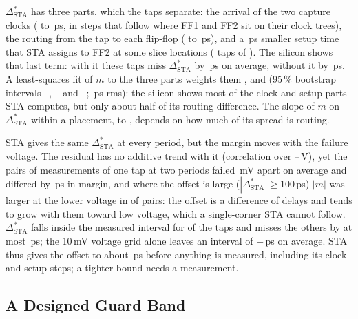 \documentclass[conference]{IEEEtran}
\newcommand{\Dst}{\Delta^{*}_\mathrm{STA}}
\begin{document}
$\Dst$ has three parts, which the \vAllN{} taps separate: the arrival of the two capture clocks
(\vDecClkLo{} to \vDecClkHi\,ps, in steps that follow where FF1 and FF2 sit on their clock trees), the routing
from the tap to each flip-flop (\vDecRouteLo{} to \vDecRouteHi\,ps), and a \vDecSuPs\,ps smaller
setup time that STA assigns to FF2 at some slice locations (\vDecSuN{} taps of \vDecSuPl). The
silicon shows that last term: with it these taps miss $\Dst$ by \vDecSuRes\,ps on average, without
it by \vDecSuNoRes\,ps. A least-squares fit of $m$ to the three parts weights them \vDecCoClk,
\vDecCoSu{} and \vDecCoRoute{} (95\,\% bootstrap intervals \vDecCoClkLo--\vDecCoClkHi,
\vDecCoSuLo--\vDecCoSuHi{} and \vDecCoRouteLo--\vDecCoRouteHi; \vDecRms\,ps rms): the silicon
shows most of the clock and setup parts STA computes, but only about half of its routing
difference. The slope of $m$ on $\Dst$ within a placement, \vPlSlopeLo{} to \vPlSlopeHi,
depends on how much of its spread is routing.

STA gives the same $\Dst$ at every period, but the margin moves with the failure voltage. The
residual has no additive trend with it (correlation \vAllResVfR{} over \vAllVfLo--\vAllVfHi\,V),
yet the \vPairN{} pairs of measurements of one tap at two periods failed \vPairDVmV\,mV apart on
average and differed by \vPairDmPs\,ps in margin, and where the offset is large
($|\Dst|\ge100$\,ps) $|m|$ was larger at the lower voltage in \vPairBigGrow{} of \vPairBigN{} pairs:
the offset is a difference of delays and tends to grow with them toward low voltage, which a
single-corner STA cannot follow. $\Dst$ falls inside the measured interval for \vAllInside{} of the
\vAllN{} taps and misses the others by at most \vAllMissMax\,ps; the 10\,mV voltage grid alone
leaves an interval of $\pm$\vAllHalfW\,ps on average. STA thus gives the offset to about \vAllRms\,ps
before anything is measured, including its clock and setup steps; a tighter bound needs a
measurement.

\subsection{A Designed Guard Band}\label{sec:guard}
\end{document}

